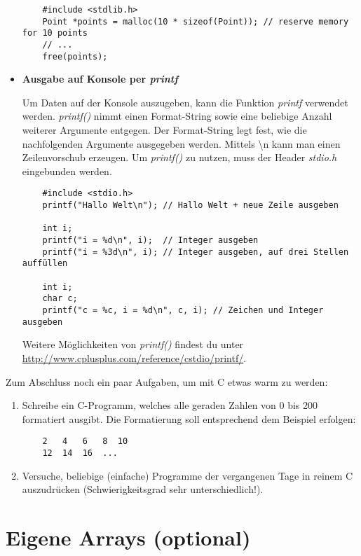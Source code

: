 \begin{itemize}
	\begin{lstlisting}
	#include <stdlib.h>
	Point *points = malloc(10 * sizeof(Point)); // reserve memory for 10 points
	// ...
	free(points);
	\end{lstlisting} 
	
	\item[] \textbf{Ausgabe auf Konsole per \emph{printf}}
	
	Um Daten auf der Konsole auszugeben, kann die Funktion \emph{printf} verwendet werden.
	\emph{printf()} nimmt einen Format-String sowie eine beliebige Anzahl weiterer Argumente entgegen.
	Der Format-String legt fest, wie die nachfolgenden Argumente ausgegeben werden.
	Mittels \textbackslash n kann man einen Zeilenvorschub erzeugen. Um \emph{printf()} zu nutzen, muss der Header \emph{stdio.h} eingebunden werden. 
	
	\begin{lstlisting}
	#include <stdio.h>
	printf("Hallo Welt\n"); // Hallo Welt + neue Zeile ausgeben
	
	int i;
	printf("i = %d\n", i);  // Integer ausgeben
	printf("i = %3d\n", i); // Integer ausgeben, auf drei Stellen auffüllen
	
	int i;
	char c;
	printf("c = %c, i = %d\n", c, i); // Zeichen und Integer ausgeben
	\end{lstlisting} 
	
	Weitere Möglichkeiten von \emph{printf()} findest du unter \url{http://www.cplusplus.com/reference/cstdio/printf/}.
	
\end{itemize}

Zum Abschluss noch ein paar Aufgaben, um mit C etwas warm zu werden:

\begin{enumerate}
	\item 
	Schreibe ein C-Programm, welches alle geraden Zahlen von 0 bis 200 formatiert ausgibt. 
	Die Formatierung soll entsprechend dem Beispiel erfolgen:
	\begin{lstlisting}
	2   4   6   8  10
	12  14  16  ...
	\end{lstlisting}
	
	\item Versuche, beliebige (einfache) Programme der vergangenen Tage in reinem C auszudrücken (Schwierigkeitsgrad sehr unterschiedlich!).
\end{enumerate}

\section{Eigene Arrays (optional)}
\label{sec:array}

